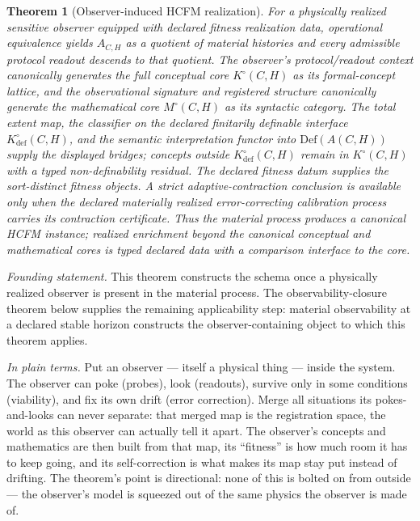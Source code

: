 \documentclass[11pt]{article}
\newtheorem{theorem}{Theorem}
\theoremstyle{definition}
\newcommand{\plainterms}{\emph{In plain terms.}}
\newcommand{\founding}{\emph{Founding statement.}}
\begin{document}
\begin{theorem}[Observer-induced HCFM realization] \label{thm:observer-induced-hcfm} For a physically realized sensitive observer equipped with declared fitness realization data, operational equivalence yields \(A_{C,H}\) as a quotient of material histories and every admissible protocol readout descends to that quotient. The observer's protocol/readout context canonically generates the full conceptual core \(K^{\circ}(C,H)\) as its formal-concept lattice, and the observational signature and registered structure canonically generate the mathematical core \(M^{\circ}(C,H)\) as its syntactic category. The total extent map, the classifier on the declared finitarily definable interface \(K^{\circ}_{\mathrm{def}}(C,H)\), and the semantic interpretation functor into \(\mathrm{Def}(A(C,H))\) supply the displayed bridges; concepts outside \(K^{\circ}_{\mathrm{def}}(C,H)\) remain in \(K^{\circ}(C,H)\) with a typed non-definability residual. The declared fitness datum supplies the sort-distinct fitness objects. A strict adaptive-contraction conclusion is available only when the declared materially realized error-correcting calibration process carries its contraction certificate. Thus the material process produces a canonical HCFM instance; realized enrichment beyond the canonical conceptual and mathematical cores is typed declared data with a comparison interface to the core. \end{theorem}

\noindent\founding{} This theorem constructs the schema once a physically realized observer is present in the material process. The observability-closure theorem below supplies the remaining applicability step: material observability at a declared stable horizon constructs the observer-containing object to which this theorem applies.

\noindent\plainterms{} Put an observer --- itself a physical thing --- inside the system. The observer can poke (probes), look (readouts), survive only in some conditions (viability), and fix its own drift (error correction). Merge all situations its pokes-and-looks can never separate: that merged map is the registration space, the world as this observer can actually tell it apart. The observer's concepts and mathematics are then built from that map, its ``fitness'' is how much room it has to keep going, and its self-correction is what makes its map stay put instead of drifting. The theorem's point is directional: none of this is bolted on from outside --- the observer's model is squeezed out of the same physics the observer is made of.
\end{document}

